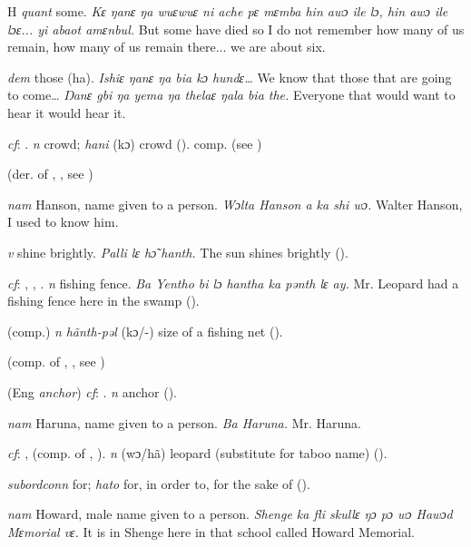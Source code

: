 \begin{letter}{H}
 \textit{quant} some. \textit{Kɛ ŋanɛ ŋa wuɛwuɛ ni ache pɛ mɛmba hin awɔ ile lɔ, hin awɔ ile lɔɛ... yi abaot amɛnbul.} But some have died so I do not remember how many of us remain, how many of us remain there... we are about six.

 \textit{dem} those (ha). \textit{Ishiɛ ŋanɛ ŋa bia kɔ hundɛ…} We know that those that are going to come… \textit{Ŋanɛ gbi ŋa yema ŋa thelaɛ ŋala bia the.} Everyone that would want to hear it would hear it.

 \textit{cf}: . \textit{n} crowd; \textit{hani} (kɔ) crowd (\citealt{Pichl1967}). comp.  (see ) 

 (der. of , , see ) 

 \textit{nam} Hanson, name given to a person. \textit{Wɔlta Hanson a ka shi wɔ.} Walter Hanson, I used to know him.

 \textit{v} shine brightly.\textit{ Palli lɛ hɔ̃ hanth.} The sun shines brightly (\citealt{Pichl1967}). 

 \textit{cf}: , , . \textit{n} fishing fence. \textit{Ba Yentho bi lɔ hantha ka pənth lɛ ay.} Mr. Leopard had a fishing fence here in the swamp (\citealt{Pichl1967}). 

 (comp.) \textit{n} \textit{hãnth-pəl} (kɔ/-) size of a fishing net (\citealt{Pichl1967}).

 (comp. of , , see ) 

 (Eng \textit{anchor}) \textit{cf}: . \textit{n} anchor (\citealt{Pichl1967}).

 \textit{nam} Haruna, name given to a person. \textit{Ba Haruna.} Mr. Haruna.

 \textit{cf}: ,  (comp. of , ). \textit{n} (wɔ/hã) leopard (substitute for taboo name) (\citealt{Pichl1967}).

 \textit{subordconn} for; \textit{hato} for, in order to, for the sake of (\citealt{Sumner1921}).

 \textit{nam} Howard, male name given to a person. \textit{Shenge ka fli skullɛ ŋɔ pɔ wɔ Hawɔd Mɛmorial vɛ.} It is in Shenge here in that school called Howard Memorial.


\end{letter}
